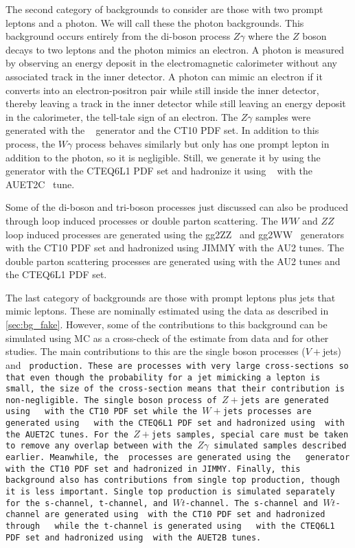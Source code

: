 The second category of backgrounds to consider are those with two 
prompt leptons and a photon. We will call these the photon backgrounds.
This background occurs entirely from the di-boson process $Z\gamma$
where the $Z$ boson decays to two leptons and the photon mimics an electron.
A photon is measured
by observing an energy deposit in the electromagnetic calorimeter 
without any associated track in the inner detector.
A photon can mimic an electron
if it converts into an electron-positron
pair while still inside the inner detector, thereby leaving a track 
in the inner detector while still leaving an energy deposit in the 
calorimeter, the tell-tale sign of an electron.
The $Z\gamma$ samples were generated with the \sherpa~\cite{sherpa} generator 
and the CT10 PDF set.  %
In addition to this process, the $W\gamma$ process behaves similarly 
but only has one prompt lepton in addition to the photon, so it is negligible.
Still, we generate it by using
the \alpgen~\cite{ALPGEN} generator with the CTEQ6L1 PDF set
and hadronize it using \jimmy~\cite{Jimmy} with the AUET2C~\cite{ATL-PHYS-PUB-2011-009} 
tune.

Some of the di-boson and tri-boson processes just discussed can also be produced
through loop induced processes or double parton scattering.
The $WW$ and $ZZ$
loop induced processes are generated using the gg2ZZ~\cite{Binoth:2008pr} 
and gg2WW~\cite{Binoth:2006mf} generators with the CT10 PDF set and
hadronized using JIMMY with the AU2 tunes.
The double parton scattering
processes are generated using \pythiaeight with the AU2 
tunes and the CTEQ6L1 PDF set. 

The last category of backgrounds are those with prompt leptons plus
jets that mimic leptons. These are nominally estimated using the data
as described in \sec\ref{sec:bg_fake}. However, some of the contributions
to this background can be simulated using MC as a cross-check of 
the estimate from data and for other studies. The main contributions
to this are the single boson processes ($V+$jets) and \tt~production.
These are processes with very large cross-sections so
that even though the probability for a jet mimicking a lepton is small,
the size of the cross-section means that their contribution is non-negligible.
The single boson process of $Z+$jets are generated using \sherpa~ with the CT10
PDF set while the $W+$jets processes are generated using \alpgen~ with
the CTEQ6L1 PDF set and hadronized using \jimmy~with the AUET2C tunes.
For the $Z+$jets samples, special care must be taken to remove any overlap 
between with the $Z\gamma$ simulated samples described earlier.
Meanwhile, the \tt~processes are generated using the \mcatnlo~\cite{MCatNLO}
generator with the CT10 PDF set and hadronized in JIMMY.  %
Finally, this background also has contributions from single top production,
though it is less important. Single top production is simulated separately 
for the s-channel, t-channel, and $Wt$-channel. The s-channel 
and $Wt$-channel are generated using \mcatnlo~with the CT10 PDF set and 
hadronized through \jimmy~ while the t-channel is generated using \madgraph~
with the CTEQ6L1 PDF set and hadronized using \pythiasix~with the AUET2B tunes.

